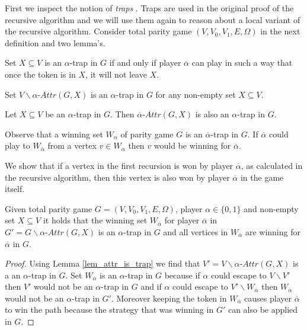 First we inspect the notion of \textit{traps} \cite{ZIELONKA1998135}. Traps are used in the original proof of the recursive algorithm and we will use them again to reason about a local variant of the recursive algorithm. Consider total parity game $(V,V_0,V_1,E,\Omega)$ in the next definition and two lemma's.
\begin{definition}\cite{ZIELONKA1998135}
	Set $X \subseteq V$ is an $\alpha$-trap in $G$ if and only if player $\overline{\alpha}$ can play in such a way that once the token is in $X$, it will not leave $X$.
\end{definition}
\begin{lemma}\label{lem_attr_is_trap}
	\cite{ZIELONKA1998135}
	Set $V\backslash \alpha\textit{-Attr}(G,X)$ is an $\alpha$-trap in $G$ for any non-empty set $X \subseteq V$.
\end{lemma}
\begin{lemma}
	\label{lem_attr_trap_is_trap}\cite{ZIELONKA1998135}
	Let $X \subseteq V$ be an $\alpha$-trap in $G$. Then $\overline{\alpha}\textit{-Attr}(G,X)$ is also an $\alpha$-trap in $G$.
\end{lemma}
Observe that a winning set $W_\alpha$ of parity game $G$ is an $\overline{\alpha}$-trap in $G$. If $\overline{\alpha}$ could play to $W_{\overline{\alpha}}$ from a vertex $v \in W_\alpha$ then $v$ would be winning for $\overline{\alpha}$.


We show that if a vertex in the first recursion is won by player $\overline{\alpha}$, as calculated in the recursive algorithm, then this vertex is also won by player $\overline{\alpha}$ in the game itself.
\begin{lemma}
	\label{lem_overlinealphawinner}
	Given total parity game $G = (V,V_0,V_1,E,\Omega)$, player $\alpha \in \{0,1\}$ and non-empty set $X \subseteq V$ it holds that the winning set $W_{\overline{\alpha}}$ for player $\overline{\alpha}$ in  $G' = G \backslash \alpha\textit{-Attr}(G,X)$ is an $\alpha$-trap in $G$ and all vertices in $W_{\overline{\alpha}}$ are winning for $\overline{\alpha}$ in $G$.
	\begin{proof}
		Using Lemma \ref{lem_attr_is_trap} we find that $V' = V \backslash \alpha\textit{-Attr}(G,X)$ is a an $\alpha$-trap in $G$. Set $W_{\overline{\alpha}}$ is an $\alpha$-trap in $G$ because if $\alpha$ could escape to $V \backslash V'$ then $V'$ would not be an $\alpha$-trap in $G$ and if $\alpha$ could escape to $V' \backslash W_{\overline{\alpha}}$ then $W_{\overline{\alpha}}$ would not be an $\alpha$-trap in $G'$. Moreover keeping the token in $W_{\overline{\alpha}}$ causes player $\overline{\alpha}$ to win the path because the strategy that was winning in $G'$ can also be applied in $G$.
	\end{proof}
\end{lemma}

